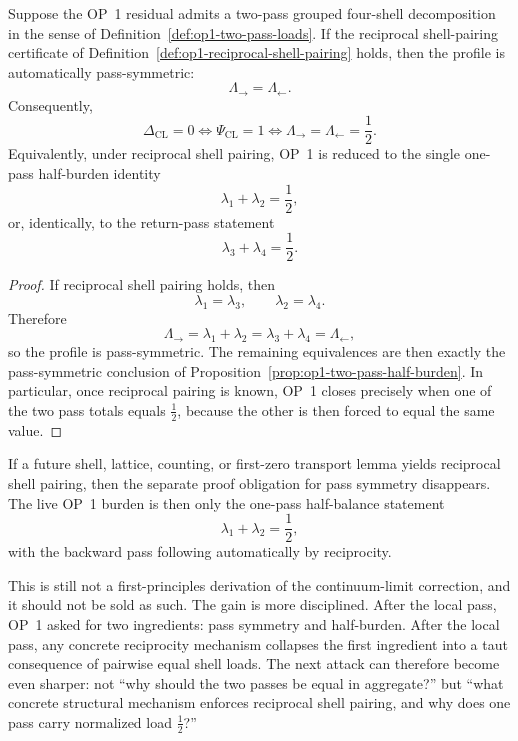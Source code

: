 \begin{proposition}
\label{prop:op1-reciprocal-pass-symmetry}
Suppose the OP~1 residual admits a two-pass grouped four-shell decomposition in the sense of Definition~\ref{def:op1-two-pass-loads}. If the reciprocal shell-pairing certificate of Definition~\ref{def:op1-reciprocal-shell-pairing} holds, then the profile is automatically pass-symmetric:
\[
 \Lambda_{\rightarrow}=\Lambda_{\leftarrow}.
\]
Consequently,
\[
 \Delta_{\mathrm{CL}}=0
 \iff
 \Psi_{\mathrm{CL}}=1
 \iff
 \Lambda_{\rightarrow}=\Lambda_{\leftarrow}=\frac12.
\]
Equivalently, under reciprocal shell pairing, OP~1 is reduced to the single one-pass half-burden identity
\[
 \lambda_1+\lambda_2=\frac12,
\]
or, identically, to the return-pass statement
\[
 \lambda_3+\lambda_4=\frac12.
\]
\end{proposition}

\begin{proof}
If reciprocal shell pairing holds, then
\[
 \lambda_1=\lambda_3,
 \qquad
 \lambda_2=\lambda_4.
\]
Therefore
\[
 \Lambda_{\rightarrow}=\lambda_1+\lambda_2
 =\lambda_3+\lambda_4=\Lambda_{\leftarrow},
\]
so the profile is pass-symmetric. The remaining equivalences are then exactly the pass-symmetric conclusion of Proposition~\ref{prop:op1-two-pass-half-burden}. In particular, once reciprocal pairing is known, OP~1 closes precisely when one of the two pass totals equals \(\tfrac12\), because the other is then forced to equal the same value.
\end{proof}

\begin{corollary}
\label{cor:op1-live-burden-after-r06}
If a future shell, lattice, counting, or first-zero transport lemma yields reciprocal shell pairing, then the separate proof obligation for pass symmetry disappears. The live OP~1 burden is then only the one-pass half-balance statement
\[
 \lambda_1+\lambda_2=\frac12,
\]
with the backward pass following automatically by reciprocity.
\end{corollary}

\begin{remark}
This is still not a first-principles derivation of the continuum-limit correction, and it should not be sold as such. The gain is more disciplined. After the local pass, OP~1 asked for two ingredients: pass symmetry and half-burden. After the local pass, any concrete reciprocity mechanism collapses the first ingredient into a taut consequence of pairwise equal shell loads. The next attack can therefore become even sharper: not ``why should the two passes be equal in aggregate?'' but ``what concrete structural mechanism enforces reciprocal shell pairing, and why does one pass carry normalized load \(\tfrac12\)?''
\end{remark}


